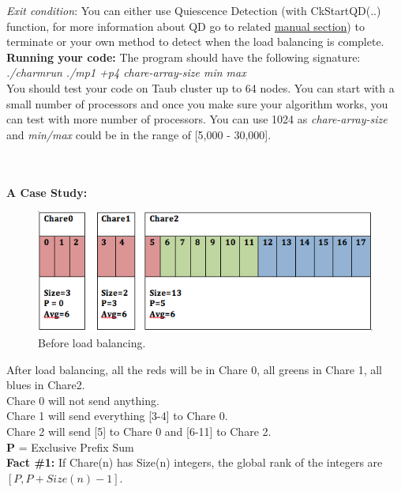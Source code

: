 \documentclass{article}
\begin{document}
\emph{Exit condition}: You can either use Quiescence Detection (with CkStartQD(..) function, for more
information about QD go to related
\href{http://charm.cs.illinois.edu/manuals/html/charm++/12.html#SECTION02350000000000000000}{manual
section}) to terminate or your own method to detect when
the load balancing is complete. \\


\textbf{Running your code:}
The program should have the following signature: \\
\textit{./charmrun ./mp1 +p4 chare-array-size min max} \\

You should test your code on Taub cluster up to 64 nodes. You can start with a small
number of processors and once you make sure your algorithm works, you can test
with more number of processors. You can use 1024 as
\textit{chare-array-size} and \textit{min/max} could be in the range of [5,000 - 30,000].
\\ \\ \\

\pagebreak

\textbf{A Case Study:} 

\begin{figure}[h]
\centering
\includegraphics[width=\textwidth]{before_balance.png}
\caption{Before load balancing.}
\label{prefix}
\end{figure}

After load balancing, all the reds will be in Chare 0, all greens in Chare 1, all blues in Chare2. \\
Chare 0 will not send anything.\\
Chare 1 will send everything [3-4] to Chare 0.\\
Chare 2 will send [5] to Chare 0 and [6-11] to Chare 2.\\

\textbf{P} = Exclusive Prefix Sum \\

\textbf{Fact \#1:}
If Chare(n) has Size(n) integers, the global rank of the integers are $[P, P+Size(n)-1]$.
\end{document}
